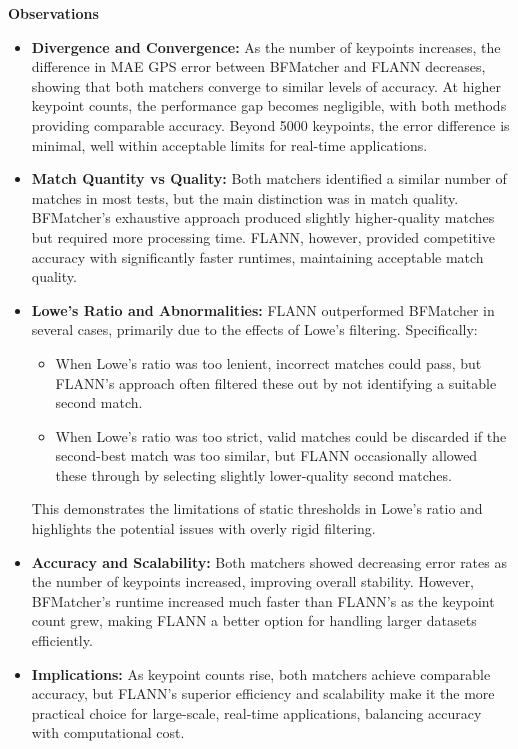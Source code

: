 \textbf{Observations}

\begin{itemize}
    \item \textbf{Divergence and Convergence:}  
    As the number of keypoints increases, the difference in MAE GPS error between BFMatcher and FLANN decreases, showing that both matchers converge to similar levels of accuracy. At higher keypoint counts, the performance gap becomes negligible, with both methods providing comparable accuracy. Beyond 5000 keypoints, the error difference is minimal, well within acceptable limits for real-time applications.

    \item \textbf{Match Quantity vs Quality:}  
    Both matchers identified a similar number of matches in most tests, but the main distinction was in match quality. BFMatcher's exhaustive approach produced slightly higher-quality matches but required more processing time. FLANN, however, provided competitive accuracy with significantly faster runtimes, maintaining acceptable match quality.

    \item \textbf{Lowe's Ratio and Abnormalities:}  
    FLANN outperformed BFMatcher in several cases, primarily due to the effects of Lowe's filtering. Specifically:
    \begin{itemize}
        \item When Lowe's ratio was too lenient, incorrect matches could pass, but FLANN's approach often filtered these out by not identifying a suitable second match.
        \item When Lowe's ratio was too strict, valid matches could be discarded if the second-best match was too similar, but FLANN occasionally allowed these through by selecting slightly lower-quality second matches.
    \end{itemize}
    This demonstrates the limitations of static thresholds in Lowe's ratio and highlights the potential issues with overly rigid filtering.

    \item \textbf{Accuracy and Scalability:}  
    Both matchers showed decreasing error rates as the number of keypoints increased, improving overall stability. However, BFMatcher’s runtime increased much faster than FLANN's as the keypoint count grew, making FLANN a better option for handling larger datasets efficiently.

    \item \textbf{Implications:}  
    As keypoint counts rise, both matchers achieve comparable accuracy, but FLANN's superior efficiency and scalability make it the more practical choice for large-scale, real-time applications, balancing accuracy with computational cost.
\end{itemize}



